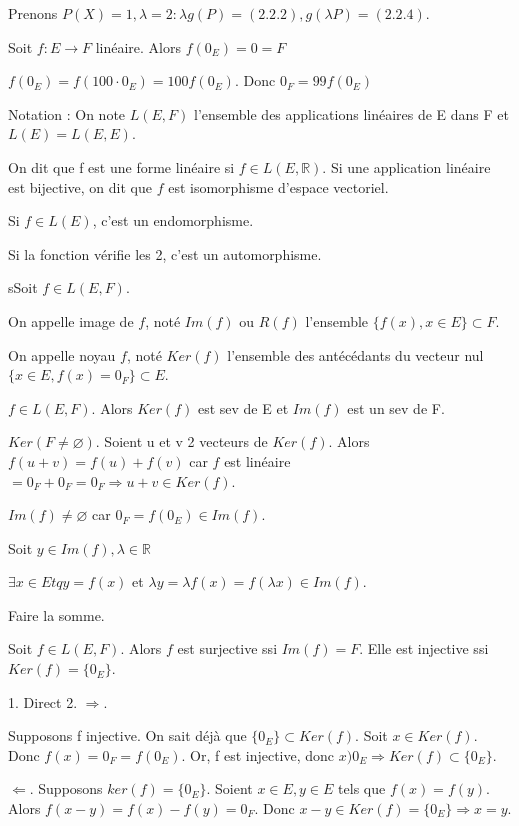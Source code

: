 \documentclass[french]{yLectureNote}
\newcommand{\R}[0]{\mathbb{R}}
\begin{document}
Prenons $P(X)=1,\lambda=2 : \lambda g(P) = (2.2.2), g(\lambda P) = (2.2.4)$.
\begin{proposition}
Soit $f:E\to F$ linéaire. Alors $f(0_E) = 0=F$
\end{proposition}
\begin{myproof}
 $f(0_E) = f(100\cdot 0_E) = 100 f(0_E)$. Donc $0_F = 99 f(0_E)$
\end{myproof}
Notation : On note $L(E,F)$ l'ensemble des applications linéaires de E dans F et $L(E) = L(E,E)$.
\begin{definition}
On dit que f est une forme linéaire si $f\in L(E,\R)$. Si une application linéaire est bijective, on dit que $f$ est isomorphisme d'espace vectoriel.

Si \(f\in L(E)\), c'est un endomorphisme.

 Si la fonction vérifie les 2, c'est un automorphisme.
\end{definition}
\begin{definition}
sSoit $f\in L(E,F)$.

On appelle image de $f$, noté $Im(f)$ ou $R(f)$ l'ensemble $\{f(x),x\in E \}\subset F$.

On appelle noyau $f$, noté $Ker(f)$ l'ensemble des antécédants du vecteur nul $\{x\in E, f(x)=0_F\}\subset E$.
\end{definition}
\begin{proposition}
\(f\in L(E,F)\). Alors \(Ker(f)\) est sev de E et \(Im(f)\) est un sev de F.
\end{proposition}
\begin{myproof}
 $Ker(F\neq \varnothing)$. Soient u et v 2 vecteurs de $Ker(f)$. Alors $f(u+v) = f(u)+f(v)$ car $f$ est linéaire $= 0_F+0_F = 0_F \Rightarrow u+v\in Ker(f)$.

 $Im(f)\neq \varnothing$ car $0_F = f(0_E)\in Im(f)$.

 Soit $y\in Im(f), \lambda \in \R$

 $\exists x\in E tq y = f(x)$ et $\lambda y = \lambda f(x) = f(\lambda x) \in Im(f)$.

 Faire la somme.
\end{myproof}
\begin{proposition}
Soit \(f\in L(E,F)\). Alors \(f\) est surjective ssi \(Im(f)=F\). Elle est injective ssi \(Ker(f) = \{0_E\}\).
\end{proposition}
\begin{myproof}
 1. Direct
 2. $\Rightarrow$.

 Supposons f injective. On sait déjà que $\{0_E\}\subset Ker(f)$. Soit $x\in Ker(f)$. Donc $f(x) =0_F = f(0_E)$. Or, f est injective, donc $x)0_E \Rightarrow Ker(f)\subset \{0_E\}$.

 $\Leftarrow$.
 Supposons $ker(f) = \{0_E\}$. Soient $x\in E, y\in E$ tels que $f(x) = f(y)$. Alors $f(x-y) = f(x)-f(y) = 0_F$. Donc $x-y\in Ker(f) = \{0_E\} \Rightarrow x=y$.
\end{myproof}
\end{document}
